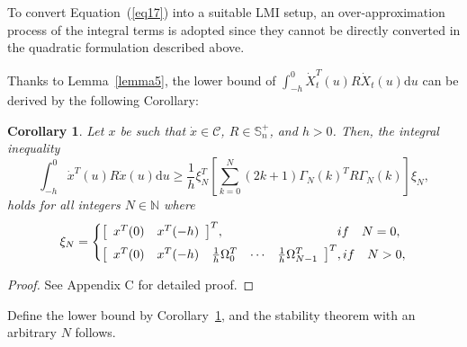 \documentclass[a4paper]{cas-sc}
\newtheorem*{proof}{Proof}
\newtheorem{corollary}[theorem]{Corollary}
\begin{document}
To convert Equation~(\ref{eq17}) into a suitable LMI setup, an over-approximation process of the integral terms is adopted since they cannot be directly converted in the quadratic formulation described above.

Thanks to Lemma~\ref{lemma5}, the lower bound of $\int_{ - h}^0 {\dot X_t^T} (u)R{\dot X_t}(u){\text{d}}u$ can be derived by the following Corollary:
\begin{corollary}
  \label{corollary9}
  Let $x$ be such that $\dot x \in \mathcal{C}$, $R \in \mathbb{S}_n^ + $, and $h > 0$. Then, the integral inequality
  \begin{equation}
    \int_{ - h}^0 {{{\dot x}^T}} (u)R\dot x(u){\text{d}}u \geqslant \frac{1}{h}\xi _N^T\left[ {\sum\limits_{k = 0}^N {(2k + 1)} {\Gamma _N}{{(k)}^T}R{\Gamma _N}(k)} \right]{\xi _N},
    \label{eq18}
  \end{equation}
  holds for all integers $N \in \mathbb{N}$ where
  \begin{equation}
    {\xi _N} = \left\{ \begin{gathered}
      {\left[ {\begin{array}{*{20}{c}}
                {{x^T}(0)} & {{x^T}( - h)}
              \end{array}} \right]^T},\quad \quad \quad \quad \quad \quad \quad \quad \quad if\quad N = 0, \hfill \\
      {\left[ {\begin{array}{*{20}{c}}
              {{x^T}(0)} & {{x^T}( - h)} & {\frac{1}{h}\Omega _0^T} & \cdots & {\frac{1}{h}\Omega _{N - 1}^T}
            \end{array}} \right]^T},if\quad N > 0, \hfill \\
    \end{gathered}  \right.
    \label{eq19}
  \end{equation}
\end{corollary}
\begin{proof}
  See Appendix C for detailed proof.
\end{proof}

Define the lower bound by Corollary~\ref{corollary9}, and the stability theorem with an arbitrary $N$ follows.
\end{document}
